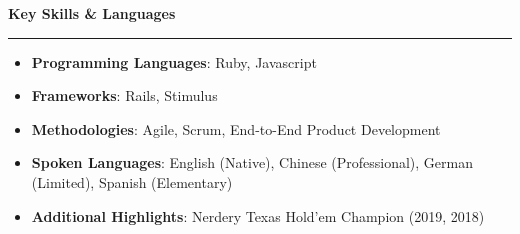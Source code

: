\documentclass[letterpaper,10pt]{article}
\newcommand{\resheading}[1]{
  \vspace{10pt}
  \textbf{\large #1}
  \vspace{5pt}
  \hrule
  \vspace{5pt}
}
\begin{document}
\resheading{Key Skills \& Languages}
\begin{itemize}
  \item \textbf{Programming Languages}: Ruby, Javascript
  \item \textbf{Frameworks}: Rails, Stimulus
  \item \textbf{Methodologies}: Agile, Scrum, End-to-End Product Development
  \item \textbf{Spoken Languages}: English (Native), Chinese (Professional), German (Limited), Spanish (Elementary)
  \item \textbf{Additional Highlights}: Nerdery Texas Hold'em Champion (2019, 2018)
\end{itemize}




\end{document}
